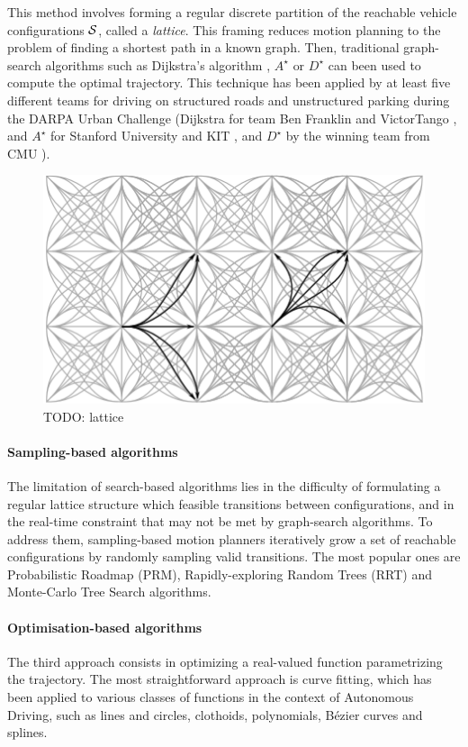 This method involves forming a regular discrete partition of the reachable vehicle configurations $\mathcal{S}$, called a \emph{lattice}. This framing reduces motion planning to the problem of finding a shortest path in a known graph. Then, traditional graph-search algorithms such as Dijkstra's algorithm \citep{Dijkstra1959}, $A^\star$ \citep{Hart1968} or $D^\star$ \citep{Stentz1994} can been used to compute the optimal trajectory. This technique has been applied by at least five different teams for driving on structured roads and unstructured parking during the DARPA Urban Challenge (Dijkstra for team Ben Franklin \citep{Bohren2008} and VictorTango \citep{Bacha2008}, and $A^\star$ for Stanford University \citep{Montemerlo2008} and KIT \citep{Kammel2008}, and $D^\star$ by the winning team from CMU \citep{Urmson2008}).

\begin{figure}[tp]
	\centering
	\includegraphics[width=0.5\linewidth]{img/lattice2}
	\caption{TODO: lattice}
\end{figure}

\paragraph{Sampling-based algorithms}

The limitation of search-based algorithms lies in the difficulty of formulating a regular lattice structure which feasible transitions between configurations, and in the real-time constraint that may not be met by graph-search algorithms. To address them, sampling-based motion planners iteratively grow a set of reachable configurations by randomly sampling valid transitions. The most popular ones are Probabilistic Roadmap (PRM), Rapidly-exploring Random Trees (RRT) and Monte-Carlo Tree Search algorithms.

\paragraph{Optimisation-based algorithms}

The third approach consists in optimizing a real-valued function parametrizing the trajectory. The most straightforward approach is curve fitting, which has been applied to various classes of functions in the context of Autonomous Driving, such as lines and circles, clothoids, polynomials, Bézier curves and splines.


